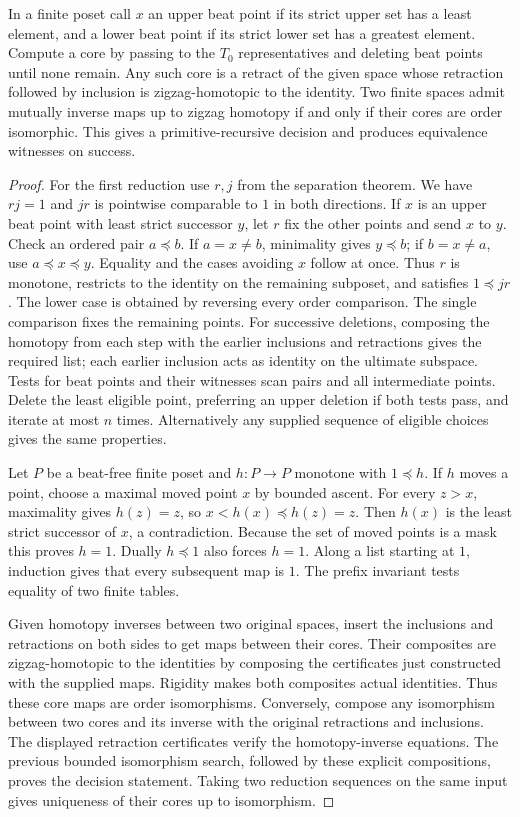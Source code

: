 \begin{theorem}\label{idx-finite453}
In a finite poset call $x$ an upper beat point if its strict upper set has a
least element, and a lower beat point if its strict lower set has a greatest
element. Compute a core by passing to the $T_0$ representatives and deleting
beat points until none remain. Any such core is a retract of the given space
whose retraction followed by inclusion is zigzag-homotopic to the
identity. Two finite spaces admit mutually inverse maps up to zigzag homotopy
if and only if their cores are order isomorphic. This gives a
primitive-recursive decision and produces equivalence witnesses on success.
\end{theorem}
\begin{proof}
For the first reduction use $r,j$ from the separation theorem.
We have $rj=1$ and $jr$ is pointwise comparable to $1$ in both directions.
If $x$ is an upper beat point with least strict successor $y$, let $r$
fix the other points and send $x$ to $y$. Check an ordered pair
$a\preceq b$. If $a=x\ne b$, minimality gives $y\preceq b$; if
$b=x\ne a$, use $a\preceq x\preceq y$. Equality and the cases avoiding
$x$ follow at once. Thus $r$ is monotone, restricts to the identity on
the remaining subposet, and satisfies $1\preceq jr$. The lower case is
obtained by reversing every order comparison. The single comparison fixes
the remaining points. For successive deletions, composing the homotopy from
each step with the earlier inclusions and retractions gives the required
list; each earlier inclusion acts as identity on the ultimate subspace.
Tests for beat points and their witnesses scan pairs and all intermediate
points. Delete the least eligible point, preferring an upper deletion if
both tests pass, and iterate at most $n$ times. Alternatively any supplied
sequence of eligible choices gives the same properties.

Let $P$ be a beat-free finite poset and $h:P\to P$ monotone with
$1\preceq h$. If $h$ moves a point, choose a maximal moved point $x$ by
bounded ascent. For every $z>x$, maximality gives $h(z)=z$, so
$x<h(x)\preceq h(z)=z$. Then $h(x)$ is the least strict successor of
$x$, a contradiction. Because the set of moved points is a mask this proves
$h=1$. Dually $h\preceq 1$ also forces $h=1$. Along a list starting at
$1$, induction gives that every subsequent map is $1$. The prefix
invariant tests equality of two finite tables.

Given homotopy inverses between two original spaces, insert the
inclusions and retractions on both sides to get maps between their cores.
Their composites are zigzag-homotopic to the identities by composing the
certificates just constructed with the supplied maps. Rigidity makes both
composites actual identities. Thus these core maps are order isomorphisms.
Conversely, compose any isomorphism between two cores and its inverse with
the original retractions and inclusions. The displayed retraction
certificates verify the homotopy-inverse equations. The previous bounded
isomorphism search, followed by these explicit compositions, proves the
decision statement. Taking two reduction sequences on the same input gives
uniqueness of their cores up to isomorphism.
\end{proof}


